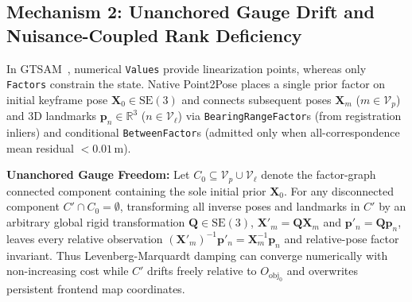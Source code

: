\documentclass[10pt,journal]{IEEEtran}
\begin{document}
\subsection{Mechanism 2: Unanchored Gauge Drift and Nuisance-Coupled Rank Deficiency}
In GTSAM~\cite{gtsam}, numerical \texttt{Values} provide linearization points, whereas only \texttt{Factors} constrain the state. Native Point2Pose places a single prior factor on initial keyframe pose $\mathbf{X}_0\in\mathrm{SE}(3)$ and connects subsequent poses $\mathbf{X}_m$ ($m\in\mathcal{V}_p$) and 3D landmarks $\mathbf{p}_n\in\mathbb{R}^3$ ($n\in\mathcal{V}_\ell$) via \texttt{BearingRangeFactor}s (from registration inliers) and conditional \texttt{BetweenFactor}s (admitted only when all-correspondence mean residual $<0.01\,\mathrm{m}$).

\textbf{Unanchored Gauge Freedom:} Let $C_0\subseteq\mathcal{V}_p\cup\mathcal{V}_\ell$ denote the factor-graph connected component containing the sole initial prior $\mathbf{X}_0$. For any disconnected component $C'\cap C_0=\emptyset$, transforming all inverse poses and landmarks in $C'$ by an arbitrary global rigid transformation $\mathbf{Q}\in\mathrm{SE}(3)$, $\mathbf{X}'_m=\mathbf{Q}\mathbf{X}_m$ and $\mathbf{p}'_n=\mathbf{Q}\mathbf{p}_n$, leaves every relative observation $(\mathbf{X}'_m)^{-1}\mathbf{p}'_n=\mathbf{X}_m^{-1}\mathbf{p}_n$ and relative-pose factor invariant. Thus Levenberg-Marquardt damping can converge numerically with non-increasing cost while $C'$ drifts freely relative to $O_{\mathrm{obj}_0}$ and overwrites persistent frontend map coordinates.
\end{document}
